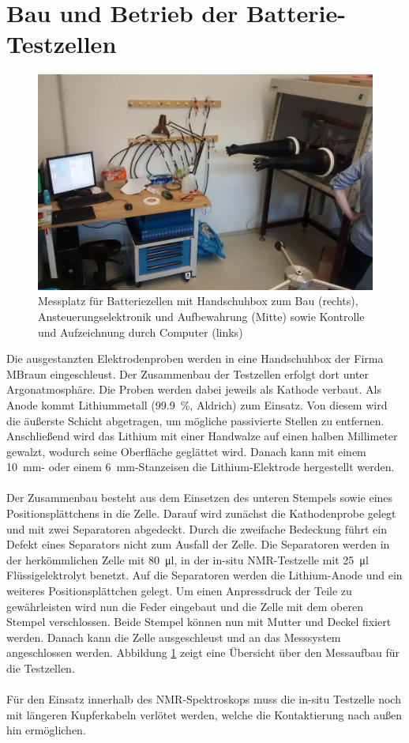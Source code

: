 \documentclass[a4paper, 11pt, headsepline,footsepline,twoside,abstract]{scrbook}
\begin{document}
\section{Bau und Betrieb der Batterie-Testzellen}
\label{bau_zellen}
\begin{figure}
	\centering
	\includegraphics[width=0.95\columnwidth]{images/Messplatz.jpg}
	\caption{Messplatz für Batteriezellen mit Handschuhbox zum Bau (rechts), Ansteuerungselektronik und Aufbewahrung (Mitte) sowie Kontrolle und Aufzeichnung durch Computer (links)}
	\label{messaufbau}
\end{figure}
Die ausgestanzten Elektrodenproben werden in eine Handschuhbox der Firma MBraun eingeschleust. Der Zusammenbau der Testzellen erfolgt dort unter Argonatmosphäre. Die Proben werden dabei jeweils als Kathode verbaut. Als Anode kommt Lithiummetall (\SI{99.9}{\percent}, Aldrich) zum Einsatz. Von diesem wird die äußerste Schicht abgetragen, um mögliche passivierte Stellen zu entfernen. Anschließend wird das Lithium mit einer Handwalze auf einen halben Millimeter gewalzt, wodurch seine Oberfläche geglättet wird. Danach kann mit einem \SI{10}{\milli\metre}- oder einem \SI{6}{\milli\metre}-Stanzeisen die Lithium-Elektrode hergestellt werden.
\\\\
Der Zusammenbau besteht aus dem Einsetzen des unteren Stempels sowie eines Positionsplättchens in die Zelle. Darauf wird zunächst die Kathodenprobe gelegt und mit zwei Separatoren abgedeckt. Durch die zweifache Bedeckung führt ein Defekt eines Separators nicht zum Ausfall der Zelle. Die Separatoren werden in der herkömmlichen Zelle mit \SI{80}{\micro\litre}, in der in-situ NMR-Testzelle mit \SI{25}{\micro\litre} Flüssigelektrolyt benetzt. Auf die Separatoren werden die Lithium-Anode und ein weiteres Positionsplättchen gelegt. Um einen Anpressdruck der Teile zu gewährleisten wird nun die Feder eingebaut und die Zelle mit dem oberen Stempel verschlossen. Beide Stempel können nun mit Mutter und Deckel fixiert werden. Danach kann die Zelle ausgeschleust und an das Messsystem angeschlossen werden. Abbildung \ref{messaufbau} zeigt eine Übersicht über den Messaufbau für die Testzellen.
\\\\
Für den Einsatz innerhalb des NMR-Spektroskops muss die in-situ Testzelle noch mit längeren Kupferkabeln verlötet werden, welche die Kontaktierung nach außen hin ermöglichen.
\end{document}
